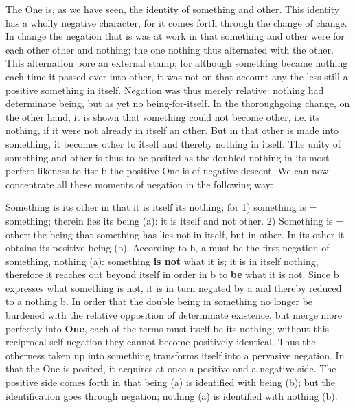 \documentclass[12pt,a4paper,openany]{book}
\newcommand{\opage}[1]{\marginnote{\footnotesize\textit{[#1]}}}
\begin{document}
The One is, as we have seen, the identity of something and
other. This identity has a wholly negative character,
for it comes forth through the change of change.
In change the negation that is was at work
in that something and other were for each other other
and nothing; the one nothing thus alternated with the
other. This alternation bore an external stamp; for
although something became nothing each time it passed over
into other, it was not on that account any the less still a positive
something in itself. Negation was thus merely relative: nothing had determinate being, but as yet no being-for-itself.
In the thoroughgoing change, on the other hand, it is shown that something could not become other, i.e. its
nothing, if it were not already in itself an other. But
in that other is made into something, it becomes other to itself
and thereby nothing in itself. The unity of something and other
is thus to be posited as the doubled nothing in
its most perfect likeness to itself: the positive
One is of negative descent. We can now concentrate
all these moments of negation in the following way:

Something is its other in that it is itself its nothing;
for 1) something is = something; therein lies its being (a):
it is itself and not other. 2) Something is = other:
the being that something has lies not in itself, but in
other. In its other it obtains its positive being (b).
According to b, a must be the first negation of something, nothing (a): something \textbf{is not} what it is; it is in itself nothing,
therefore it reaches out beyond itself in order in b to \textbf{be} what it is not. Since b expresses what something is not,
it is in turn negated by a and thereby reduced to
a nothing b. In order that the double being in something no
longer be burdened with the relative
\setcounter{footnote}{0}%
\opage{22}opposition of determinate existence, but merge more perfectly into \textbf{One}, each
of the terms must itself be its nothing; without this reciprocal
self-negation they cannot become positively identical. Thus the otherness taken up into something transforms itself into
a pervasive negation. In that the One is posited,
it acquires at once a positive and a negative side. The positive side comes forth in that being (a)
is identified with being (b); but the identification goes
through negation; nothing (a) is identified with nothing (b).
\end{document}
